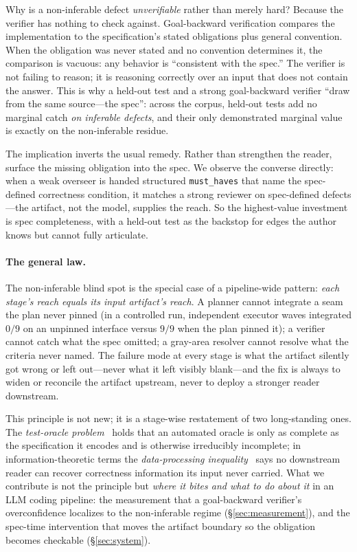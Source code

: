 \documentclass[11pt]{article}
\newcommand{\code}[1]{\texttt{#1}}
\begin{document}
Why is a non-inferable defect \emph{unverifiable} rather than merely hard? Because the verifier has
nothing to check against. Goal-backward verification compares the implementation to the
specification's stated obligations plus general convention. When the obligation was never stated and
no convention determines it, the comparison is vacuous: any behavior is ``consistent with the spec.''
The verifier is not failing to reason; it is reasoning correctly over an input that does not contain
the answer. This is why a held-out test and a strong goal-backward verifier ``draw from the same
source---the spec'': across the corpus, held-out tests add no marginal catch \emph{on inferable
defects}, and their only demonstrated marginal value is exactly on the non-inferable residue.

The implication inverts the usual remedy. Rather than strengthen the reader, surface the missing
obligation into the spec. We observe the converse directly: when a weak overseer is handed structured
\code{must\_haves} that name the spec-defined correctness condition, it matches a strong reviewer on
spec-defined defects---the artifact, not the model, supplies the reach. So the highest-value
investment is spec completeness, with a held-out test as the backstop for edges the author knows but
cannot fully articulate.

\paragraph{The general law.} The non-inferable blind spot is the special case of a pipeline-wide
pattern: \emph{each stage's reach equals its input artifact's reach}. A planner cannot integrate a
seam the plan never pinned (in a controlled run, independent executor waves integrated $0/9$ on an
unpinned interface versus $9/9$ when the plan pinned it); a verifier cannot catch what the spec
omitted; a gray-area resolver cannot resolve what the criteria never named. The failure mode at every
stage is what the artifact silently got wrong or left out---never what it left visibly blank---and
the fix is always to widen or reconcile the artifact upstream, never to deploy a stronger reader
downstream.

This principle is not new; it is a stage-wise restatement of two long-standing ones. The
\emph{test-oracle problem}~\cite{oracleproblem} holds that an automated oracle is only as complete as
the specification it encodes and is otherwise irreducibly incomplete; in information-theoretic terms
the \emph{data-processing inequality}~\cite{coverthomas} says no downstream reader can recover
correctness information its input never carried. What we contribute is not the principle but
\emph{where it bites and what to do about it} in an LLM coding pipeline: the measurement that a
goal-backward verifier's overconfidence localizes to the non-inferable regime
(\S\ref{sec:measurement}), and the spec-time intervention that moves the artifact boundary so the
obligation becomes checkable (\S\ref{sec:system}).
\end{document}
